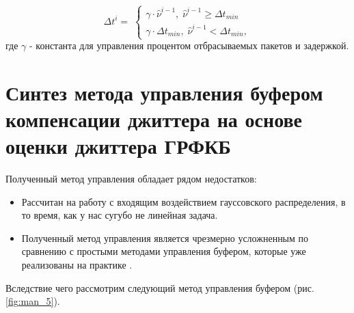 \begin{equation}\label{eq41:syntes5}
\Delta t^i= \;
\begin{cases}
\gamma\cdot\hat{\nu}^{i-1}, \; \hat{\nu}^{i-1} \geq \Delta t_{min} \\    
\gamma\cdot\Delta t_{min}, \;  \hat{\nu}^{i-1} < \Delta t_{min},    
\end{cases}
\end{equation}
\noindent где $\gamma$ - константа для управления процентом отбрасываемых пакетов и задержкой.


\section{Синтез метода управления буфером компенсации джиттера на основе оценки джиттера ГРФКБ}

Полученный метод управления обладает рядом недостатков:
\begin{itemize}
 \item Рассчитан на работу с входящим воздействием гауссовского распределения, в то время, как у нас сугубо не линейная задача.
 \item Полученный метод управления является чрезмерно усложненным по сравнению с простыми методами управления буфером, которые уже реализованы на практике \cite{Moon,jesuspinto1999algorithms,YoungJongChoChongKwanUn19941385,DBLP:journals/iet-com/Gade07,Hafskjold:2003:AAO:963600.963677}.  
\end{itemize}

Вследствие чего рассмотрим следующий метод управления буфером (рис. \ref{fig:man_5}).


